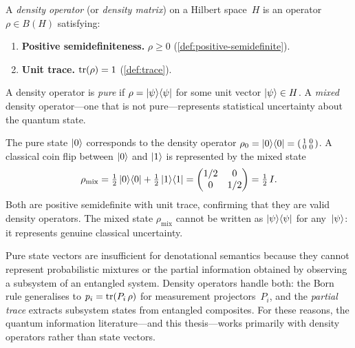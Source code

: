\begin{definition}
\label{def:density-operator}
A \emph{density operator} (or \emph{density matrix}) on a Hilbert
space~$H$ is an operator $\rho \in B(H)$ satisfying:
\begin{enumerate}
  \item \textbf{Positive semidefiniteness.}
    $\rho \geq 0$ (\cref{def:positive-semidefinite}).
  \item \textbf{Unit trace.} $\operatorname{tr}(\rho) = 1$ (\cref{def:trace}).
\end{enumerate}
\end{definition}

\noindent
A density operator is \emph{pure} if $\rho = \ket{\psi}\!\bra{\psi}$
for some unit vector $\ket{\psi} \in H$.
A \emph{mixed} density operator---one that is not pure---represents
statistical uncertainty about the quantum state.

\begin{example}
\label{ex:qubit-density}
The pure state $\ket{0}$ corresponds to the density operator
$\rho_0 = \ket{0}\!\bra{0} =
\begin{psmallmatrix} 1 & 0 \\ 0 & 0 \end{psmallmatrix}$.
A classical coin flip between $\ket{0}$ and $\ket{1}$ is represented
by the mixed state
\[
  \rho_{\mathrm{mix}}
  = \tfrac{1}{2}\ket{0}\!\bra{0} + \tfrac{1}{2}\ket{1}\!\bra{1}
  = \begin{pmatrix} 1/2 & 0 \\ 0 & 1/2 \end{pmatrix}
  = \tfrac{1}{2}\,I.
\]
Both are positive semidefinite with unit trace, confirming that they
are valid density operators.
The mixed state $\rho_{\mathrm{mix}}$ cannot be written as
$\ket{\psi}\!\bra{\psi}$ for any~$\ket{\psi}$: it represents
genuine classical uncertainty.
\end{example}

\begin{remark}
\label{rem:why-density}
Pure state vectors are insufficient for denotational semantics because
they cannot represent probabilistic mixtures or the partial
information obtained by observing a subsystem of an entangled system.
Density operators handle both: the Born rule generalises to
$p_i = \operatorname{tr}(P_i\,\rho)$ for measurement projectors~$P_i$, and the
\emph{partial trace} extracts subsystem states from entangled
composites.
For these reasons, the quantum information
literature---and this thesis---works primarily with density operators
rather than state vectors.
\end{remark}

